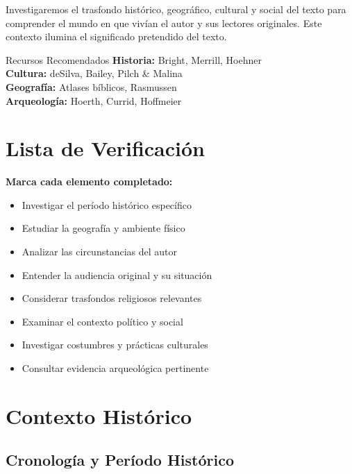 \documentclass[11pt,a4paper]{article}
\begin{document}
Investigaremos el trasfondo histórico, geográfico, cultural y social del texto para comprender el mundo en que vivían el autor y sus lectores originales. Este contexto ilumina el significado pretendido del texto.

\begin{infobox}{Recursos Recomendados}
\textbf{Historia:} Bright, Merrill, Hoehner\\
\textbf{Cultura:} deSilva, Bailey, Pilch \& Malina\\
\textbf{Geografía:} Atlases bíblicos, Rasmussen\\
\textbf{Arqueología:} Hoerth, Currid, Hoffmeier
\end{infobox}

\section{Lista de Verificación}

\begin{checklistbox}
\textbf{Marca cada elemento completado:}

\begin{itemize}[leftmargin=1cm]
    \item[$\square$] Investigar el período histórico específico
    \item[$\square$] Estudiar la geografía y ambiente físico
    \item[$\square$] Analizar las circunstancias del autor
    \item[$\square$] Entender la audiencia original y su situación
    \item[$\square$] Considerar trasfondos religiosos relevantes
    \item[$\square$] Examinar el contexto político y social
    \item[$\square$] Investigar costumbres y prácticas culturales
    \item[$\square$] Consultar evidencia arqueológica pertinente
\end{itemize}
\end{checklistbox}

\newpage

\section{Contexto Histórico}

\subsection{Cronología y Período Histórico}
\end{document}

